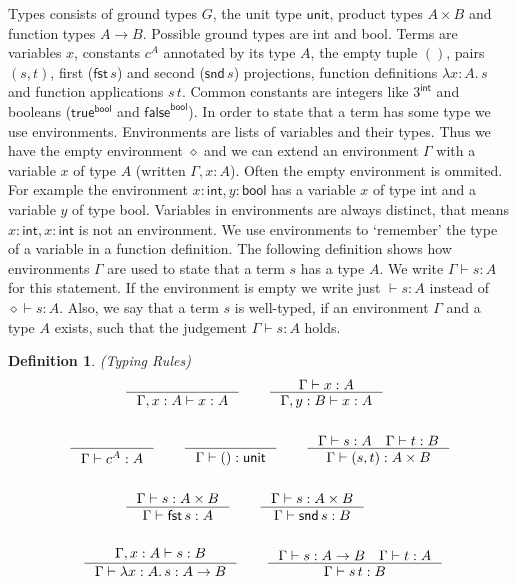 \documentclass{article}
\newtheorem{defn}{Definition}[section]
\newcommand{\type}{\vdash}
\newcommand{\unit}{\mathsf{unit}}
\newcommand{\fst}{\mathsf{fst}\,}
\newcommand{\snd}{\mathsf{snd}\,}
\newcommand{\eenv}{\diamond}
\begin{document}
Types consists of ground types $G$, the unit type $\unit$, product types $A \times B$ and function types $A \to B$.
Possible ground types are \textsf{int} and \textsf{bool}.
Terms are variables $x$, constants $c^A$ annotated by its type $A$, the empty tuple $()$, pairs $(s, t)$, first ($\fst s$) and second ($\snd s$) projections,
function definitions $\lambda x: A.\, s$ and function applications $s\,t$.
Common constants are integers like $3^{\mathsf{int}}$ and booleans ($\mathsf{true}^{\mathsf{bool}}$ and $\mathsf{false}^{\mathsf{bool}}$).
In order to state that a term has some type we use environments.
Environments are lists of variables and their types.
Thus we have the empty environment $\eenv$ and we can extend an environment $\Gamma$ with a variable $x$ of type $A$ (written $\Gamma, x: A$).
Often the empty environment is ommited.
For example the environment $x: \mathsf{int}, y: \mathsf{bool}$ has a variable $x$ of type \textsf{int} and a variable $y$ of type \textsf{bool}.
Variables in environments are always distinct, that means $x: \mathsf{int}, x: \mathsf{int}$ is not an environment.
We use environments to `remember' the type of a variable in a function definition.
The following definition shows how environments $\Gamma$ are used to state that a term $s$ has a type $A$.
We write $\Gamma \type s: A$ for this statement.
If the environment is empty we write just $\type s: A$ instead of $\eenv \type s: A$.
Also, we say that a term $s$ is well-typed, if an  environment $\Gamma$ and a type $A$ exists, such that the judgement $\Gamma \type s: A$ holds.

\begin{defn}{(Typing Rules)}
    \label{def:type}
    \begin{align*}
        &\qquad\qquad \inference{}{\Gamma, x: A \type x: A} \qquad \inference{\Gamma \type x : A}{\Gamma , y: B \type x: A}\\
        \\
        &\inference{}{\Gamma \type c^A: A} \qquad \inference{}{\Gamma \type () : \mathsf{unit}}\qquad
        \inference{\Gamma \type s: A \quad \Gamma \type t:B}{\Gamma \type (s, t) : A \times B}\\
        \\
        & \qquad\qquad \inference{\Gamma \type s : A \times B}{\Gamma \type \mathsf{fst}\,s: A} \qquad
        \inference{\Gamma \type s : A \times B}{\Gamma \type \mathsf{snd}\,s: B}\\
        \\
        & \quad \inference{\Gamma, x:A \type s: B}{\Gamma \type \lambda x: A.\, s: A \to B} \qquad
        \inference{\Gamma \type s: A \to B \quad \Gamma \type t: A}{\Gamma \type s\,t: B}
    \end{align*}
\end{defn}
\end{document}
